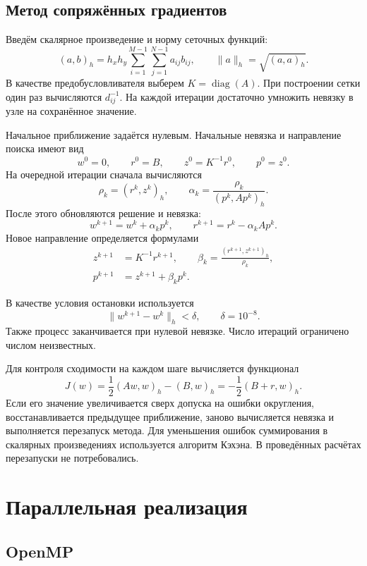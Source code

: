 \documentclass[a4paper,12pt]{extarticle}
\begin{document}
\subsection{Метод сопряжённых градиентов}

Введём скалярное произведение и норму сеточных функций:
\[
    (a,b)_h=h_xh_y\sum_{i=1}^{M-1}\sum_{j=1}^{N-1}a_{ij}b_{ij},
    \qquad
    \|a\|_h=\sqrt{(a,a)_h}.
\]
В качестве предобусловливателя выберем $K=\operatorname{diag}(A)$. При построении сетки один раз вычисляются $d_{ij}^{-1}$. На каждой итерации достаточно умножить невязку в узле на сохранённое значение.

Начальное приближение задаётся нулевым. Начальные невязка и направление поиска имеют вид
\[
    w^0=0,\qquad r^0=B,\qquad z^0=K^{-1}r^0,\qquad p^0=z^0.
\]
На очередной итерации сначала вычисляются
\[
    \rho_k=(r^k,z^k)_h,\qquad
    \alpha_k=\frac{\rho_k}{(p^k,Ap^k)_h}.
\]
После этого обновляются решение и невязка:
\[
    w^{k+1}=w^k+\alpha_kp^k,\qquad
    r^{k+1}=r^k-\alpha_kAp^k.
\]
Новое направление определяется формулами
\begin{align*}
    z^{k+1}&=K^{-1}r^{k+1},\qquad
    \beta_k=\frac{(r^{k+1},z^{k+1})_h}{\rho_k},\\
    p^{k+1}&=z^{k+1}+\beta_kp^k.
\end{align*}

В качестве условия остановки используется
\begin{equation}
    \|w^{k+1}-w^k\|_h<\delta,\qquad \delta=10^{-8}.
    \label{eq:stop}
\end{equation}
Также процесс заканчивается при нулевой невязке. Число итераций ограничено числом неизвестных.

Для контроля сходимости на каждом шаге вычисляется функционал
\[
    J(w)=\frac12(Aw,w)_h-(B,w)_h=-\frac12(B+r,w)_h.
\]
Если его значение увеличивается сверх допуска на ошибки округления, восстанавливается предыдущее приближение, заново вычисляется невязка и выполняется перезапуск метода. Для уменьшения ошибок суммирования в скалярных произведениях используется алгоритм Кэхэна. В проведённых расчётах перезапуски не потребовались.

\section{Параллельная реализация}

\subsection{OpenMP}
\end{document}
